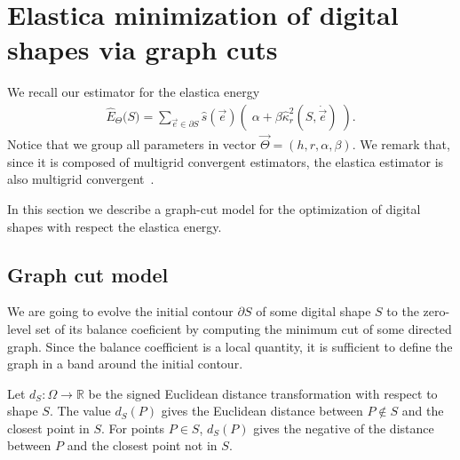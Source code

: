 \documentclass[smallextended]{svjour3}
\begin{document}
\section{Elastica minimization of digital shapes via graph cuts}
We recall our estimator for the elastica energy 
%
\begin{align}
	\hat{E}_{\Theta}\big( S \big) = \sum_{\vec{e} \in \partial S}{ \hat{s}(\vec{e})\left(\; \alpha + \beta \hat{\kappa}_{r}^2(S,\dot{\vec{e}}) \; \right)}.
	\label{eq:elastica-estimator-2}
\end{align}
%
%
Notice that we group all parameters in vector $\vec{\Theta}=(h,r,\alpha,\beta)$. We remark that, since it is composed of multigrid convergent estimators, the elastica estimator is also multigrid convergent~\cite{lachaud06hdr}.

In this section we describe a graph-cut model for the optimization of digital shapes with respect the elastica energy.

 
\subsection{Graph cut model}\label{sec:graph-cut-model}

We are going to evolve the initial contour $\partial S$ of some digital shape $S$ to the zero-level set of its balance coeficient by computing the minimum cut of some directed graph. Since the balance coefficient is a local quantity, it is sufficient to define the graph in a band around the initial contour.

Let $d_{S}:\Omega \rightarrow \mathbb{R}$ be the signed Euclidean distance transformation with respect to shape $S$. The value $d_{S}(P)$ gives the Euclidean distance between $P \notin S$ and the closest point in $S$. For points $P \in S$, $d_{S}(P)$ gives the negative of the distance between $P$ and the closest point not in $S$.
\end{document}

